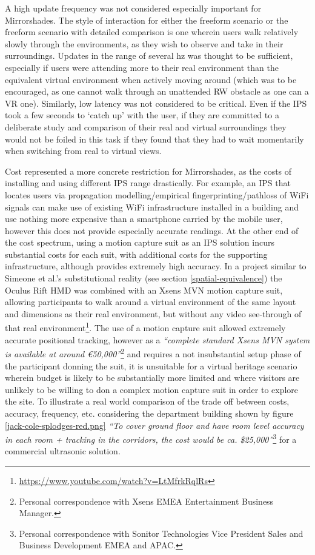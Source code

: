 A high update frequency was not considered especially important for Mirrorshades. The style of interaction for either the freeform scenario or the freeform scenario with detailed comparison is one wherein users walk relatively slowly through the environments, as they wish to observe and take in their surroundings. Updates in the range of several hz was thought to be sufficient, especially if users were attending more to their real environment than the equivalent virtual environment when actively moving around (which was to be encouraged, as one cannot walk through an unattended RW obstacle as one can a VR one). Similarly, low latency was not considered to be critical. Even if the IPS took a few seconds to `catch up' with the user, if they are committed to a deliberate study and comparison of their real and virtual surroundings they would not be foiled in this task if they found that they had to wait momentarily when switching from real to virtual views.

Cost represented a more concrete restriction for Mirrorshades, as the costs of installing and using different IPS range drastically. For example, an IPS that locates users via propagation modelling/empirical fingerprinting/pathloss of WiFi signals can make use of existing WiFi infrastructure installed in a building and use nothing more expensive than a smartphone carried by the mobile user, however this does not provide especially accurate readings. At the other end of the cost spectrum, using a motion capture suit as an IPS solution incurs substantial costs for each suit, with additional costs for the supporting infrastructure, although provides extremely high accuracy. In a project similar to Simeone et al.'s substitutional reality (see section \ref{spatial-equivalence}) the Oculus Rift HMD was combined with an Xsens MVN motion capture suit, allowing participants to walk around a virtual environment of the same layout and dimensions as their real environment, but without any video see-through of that real environment\footnote{\url{https://www.youtube.com/watch?v=LtMfrkRqlRs}}. The use of a motion capture suit allowed extremely accurate positional tracking, however as a \textit{``complete standard Xsens MVN system is available at around \euro{}50,000''}\footnote{Personal correspondence with Xsens EMEA Entertainment Business Manager.} and requires a not insubstantial setup phase of the participant donning the suit, it is unsuitable for a virtual heritage scenario wherein budget is likely to be substantially more limited and  where visitors are unlikely to be willing to don a complex motion capture suit in order to explore the site. To illustrate a real world comparison of the trade off between costs, accuracy, frequency, etc. considering the department building shown by figure \ref{jack-cole-splodges-red.png} \textit{``To cover ground floor and have room level accuracy in each room + tracking in the corridors, the cost would be ca. \$25,000''}\footnote{Personal correspondence with Sonitor Technologies Vice President Sales and Business Development EMEA and APAC.} for a commercial ultrasonic solution.

